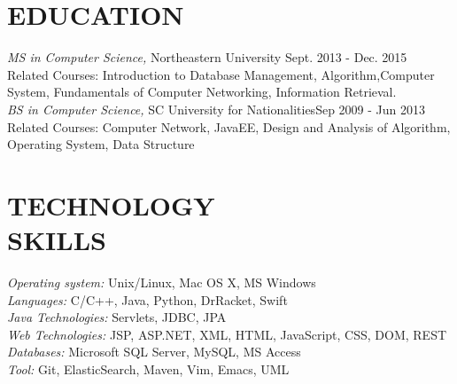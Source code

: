 \documentclass[margin, 10pt]{res}%
\begin{document}
\begin{resume}



\section{EDUCATION}

{\sl MS in Computer Science,}
 Northeastern University \hfill Sept. 2013 - Dec. 2015 \\
 Related Courses: Introduction to Database Management, Algorithm,Computer System,  Fundamentals of Computer Networking, Information Retrieval.\\[0.1in]
{\sl BS in Computer Science,}
 SC University for Nationalities\hfill Sep 2009 - Jun 2013 \\
 Related Courses: Computer Network, JavaEE, Design and Analysis of Algorithm, Operating System, Data Structure



\section{TECHNOLOGY \\ SKILLS}

{\sl Operating system:} Unix/Linux, Mac OS X, MS Windows \\
{\sl Languages:} C/C++, Java, Python, DrRacket, Swift \\
{\sl Java Technologies:} Servlets, JDBC, JPA \\
{\sl Web Technologies:} JSP, ASP.NET, XML, HTML, JavaScript, CSS, DOM, REST\\
{\sl Databases:} Microsoft SQL Server, MySQL, MS Access\\
{\sl Tool:} Git, ElasticSearch, Maven, Vim, Emacs, UML\\

\end{resume}
\end{document}
